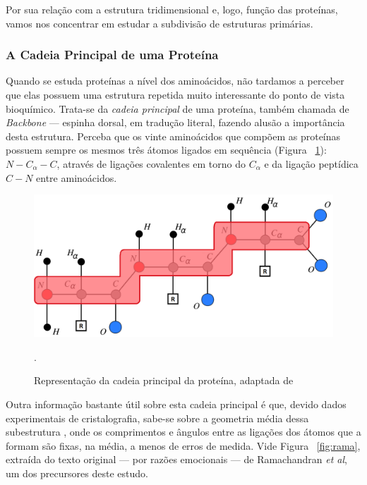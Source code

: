 \documentclass[a4paper,12pt]{article}
\begin{document}
	Por sua relação com a estrutura tridimensional e, logo, função das proteínas, vamos nos concentrar em estudar a subdivisão de estruturas primárias. 
	
	\subsubsection*{A Cadeia Principal de uma Proteína}
	Quando se estuda proteínas a nível dos aminoácidos, não tardamos a perceber que elas possuem uma estrutura repetida muito interessante do ponto de vista bioquímico. Trata-se da \textit{cadeia principal} de uma proteína, também chamada de \textit{Backbone} --- espinha dorsal, em tradução literal, fazendo alusão a importância desta estrutura. Perceba que os vinte aminoácidos que compõem as proteínas possuem sempre os mesmos três átomos ligados em sequência (Figura ~\ref{fig:backbone}): $N-C_\alpha-C$, através de ligações covalentes em torno do $C_\alpha$ e da ligação peptídica $C-N$ entre aminoácidos.
	
	\begin{figure}[H]
		\begin{center}
			\includegraphics[width=0.8\linewidth]{backbone.png}
		\end{center}
		\caption{Representação da cadeia principal da proteína, adaptada de  \cite{carlile:MinimalOrder}}.
		\label{fig:backbone}
	\end{figure}
	
	Outra informação bastante útil sobre esta cadeia principal é que, devido dados experimentais de cristalografia, sabe-se sobre a geometria média dessa subestrutura \cite{ramachandran1974MolStructure}, onde os comprimentos e ângulos entre  as ligações dos átomos que a formam são fixas, na média, a menos de erros de medida. Vide Figura ~\ref{fig:rama}, extraída do texto original --- por razões emocionais --- de Ramachandran \textit{et al}, um dos precursores deste estudo.
	
\end{document}
